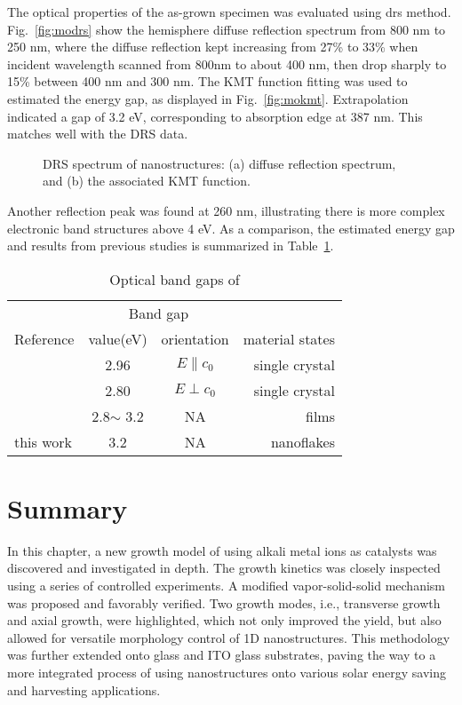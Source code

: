 %
The optical properties of the as-grown specimen was evaluated using \gls{drs} method. Fig.~\ref{fig:modrs} show the hemisphere diffuse reflection spectrum from 800 nm to 250 nm, where the diffuse reflection kept increasing from 27\% to 33\% when incident wavelength scanned from 800nm to about 400 nm, then drop sharply to 15\% between 400 nm and 300 nm. The KMT function fitting was used to estimated the energy gap, as displayed in Fig.~\ref{fig:mokmt}. Extrapolation indicated a gap of 3.2 eV, corresponding to absorption edge at 387 nm. This matches well with the DRS data.
\begin{figure}[htb]
\centering
{}\hspace{0.04\textwidth}
\caption[DRS spectrum of  nanostructures]{DRS spectrum of  nanostructures: (a) diffuse reflection spectrum, and (b) the associated KMT function.}
\label{fig:moo3drs}
\end{figure}
Another reflection peak was found at 260 nm, illustrating there is more complex electronic band structures above 4 eV. As a comparison, the estimated energy gap and results from previous studies is summarized in Table~\ref{tab:mobg}.
\begin{table}[htb]
\centering
\caption{Optical band gaps of }\label{tab:mobg}
\begin{tabular}{lccr}
\toprule
&\multicolumn{2}{c}{Band gap} \\
\cmidrule(l){2-3}
Reference & value(eV) & orientation & material states\\
\midrule
\cite{Deb1968}   & 2.96  & $E\parallel c_0$ & single crystal\\
\cite{Deb1968}   & 2.80  & $E\perp c_0$ & single crystal \\
\cite{Julien1995} & 2.8$\sim$ 3.2 & NA & films\\
 this work  & 3.2  & NA & nanoflakes\\
\bottomrule
\end{tabular}
\end{table}



\section{Summary}

In this chapter, a new growth model of  using alkali metal ions as catalysts was discovered and investigated in depth. The growth kinetics was closely inspected using a series of controlled experiments. A modified vapor-solid-solid mechanism was proposed and favorably verified. Two growth modes, i.e., transverse growth and axial growth, were highlighted, which not only improved the yield, but also allowed for versatile morphology control of 1D  nanostructures. This methodology was further extended onto glass and ITO glass substrates, paving the way to a more integrated process of using  nanostructures onto various solar energy saving and harvesting applications. 

